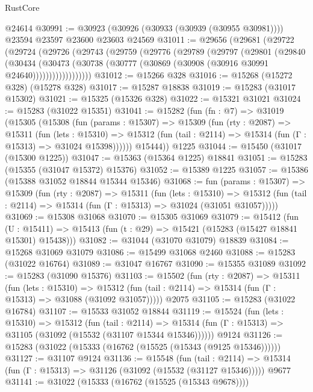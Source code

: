 \begin{lexlean}{RustCore}
\begin{coremodule}
    @24614
@30991 := @30923 (@30926 (@30933 (@30939 (@30955 @30981)))) @23594 @23597 @23600 @23603 @24569
@31011 := @29656
    (@29681
      (@29722
        (@29724
          (@29726
            (@29743
              (@29759
                (@29776
                  (@29789
                    (@29797
                      (@29801
                        (@29840
                          (@30434
                            (@30473
                              (@30738
                                (@30777 (@30869 (@30908 (@30916 @30991 @24640))))))))))))))))))
@31012 := @15266 @328
@31016 := @15268 (@15272 @328) (@15278 @328)
@31017 := @15287 @18838
@31019 := @15283 (@31017 @15302)
@31021 := @15325 (@15326 @328)
@31022 := @15321 @31021
@31024 := @15283 (@31022 @15351)
@31041 := @15282
    (fun (fn : @7) =>
    @31019
      (@15305
        (@15308
          (fun (params : @15307) =>
          @15309
            (fun (rty : @2087) =>
            @15311
              (fun (lets : @15310) =>
              @15312 (fun (tail : @2114) => @15314 (fun (Γ : @15313) => @31024 @15398))))))
        @15444))
    @1225
@31044 := @15450 (@31017 (@15300 @1225))
@31047 := @15363 (@15364 @1225) @18841
@31051 := @15283 (@15355 (@31047 @15372) @15376)
@31052 := @15389 @1225
@31057 := @15386 (@15388 @31052 @18844 @15344 @15346)
@31068 := fun (params : @15307) =>
  @15309
    (fun (rty : @2087) =>
    @15311
      (fun (lets : @15310) =>
      @15312 (fun (tail : @2114) => @15314 (fun (Γ : @15313) => @31024 (@31051 @31057)))))
@31069 := @15308 @31068
@31070 := @15305 @31069
@31079 := @15412
    (fun (U : @15411) => @15413 (fun (t : @29) => @15421 (@15283 (@15427 @18841 @15301) @15438)))
@31082 := @31044 (@31070 @31079) @18839
@31084 := @15268 @31069 @31079
@31086 := @15499 @31068 @2460
@31088 := @15283 (@31022 @16764)
@31089 := @31047 @16767
@31090 := @15355 @31089
@31092 := @15283 (@31090 @15376)
@31103 := @15502
    (fun (rty : @2087) =>
    @15311
      (fun (lets : @15310) =>
      @15312 (fun (tail : @2114) => @15314 (fun (Γ : @15313) => @31088 (@31092 @31057)))))
    @2075
@31105 := @15283 (@31022 @16784)
@31107 := @15533 @31052 @18844
@31119 := @15524
    (fun (lets : @15310) =>
    @15312
      (fun (tail : @2114) =>
      @15314 (fun (Γ : @15313) => @31105 (@31092 (@15532 (@31107 @15344 @15346))))))
    @9124
@31126 := @15283 (@31022 (@15333 (@16762 (@15525 (@15343 (@9125 @15346))))))
@31127 := @31107 @9124
@31136 := @15548
    (fun (tail : @2114) => @15314 (fun (Γ : @15313) => @31126 (@31092 (@15532 (@31127 @15346)))))
    @9677
@31141 := @31022 (@15333 (@16762 (@15525 (@15343 @9678))))

\end{coremodule}
\end{lexlean}
